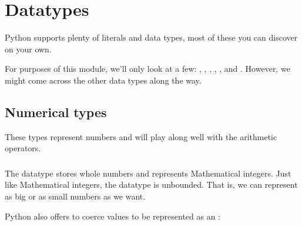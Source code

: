 \documentclass[letterpaper,10pt,english]{jupyterBook}
\begin{document}
\chapter{Datatypes}
\label{\detokenize{datatypes:datatypes}}\label{\detokenize{datatypes::doc}}
\sphinxAtStartPar
Python supports plenty of literals and data types, most of these you can discover on your own.

\sphinxAtStartPar
For purposes of this module, we’ll only look at a few: , , , , , and .
However, we might come across the other data types along the way.


\section{Numerical types}
\label{\detokenize{datatypes:numerical-types}}
\sphinxAtStartPar
These types represent numbers and will play along well with the arithmetic operators.


\subsection{}
\label{\detokenize{datatypes:int}}
\sphinxAtStartPar
The  datatype stores whole numbers and represents Mathematical integers.
Just like Mathematical integers, the  datatype is unbounded.
That is, we can represent as big or as small numbers as we want.

\sphinxAtStartPar
Python also offers  to coerce values to be represented as an :
\end{document}
